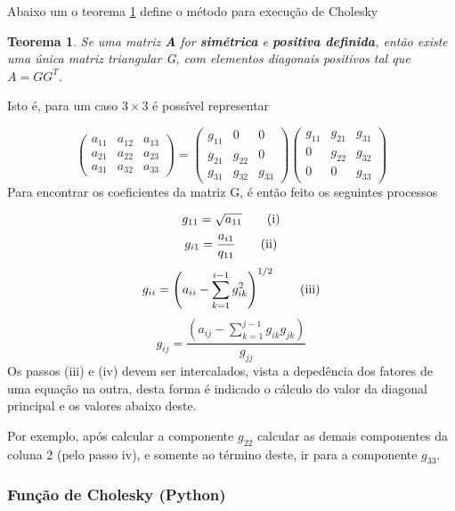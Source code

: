 \documentclass[
]{book}
\newtheorem{theorem}{Teorema}
\begin{document}
Abaixo um o teorema \ref{thm:cho} define o método para execução de Cholesky

\begin{theorem}
\protect\hypertarget{thm:cho}{}\label{thm:cho}Se uma matriz \textbf{A} for \textbf{simétrica} e \textbf{positiva definida}, então \emph{existe uma única} matriz triangular G, com elementos diagonais positivos tal que \(A = GG^T\).
\end{theorem}

Isto é, para um caso \(3 \times 3\) é possível representar

\[\begin{pmatrix} 
a_{11} & a_{12} & a_{13} \\
a_{21} & a_{22} & a_{23} \\
a_{31} & a_{32} & a_{33} 
\end{pmatrix} = 
\begin{pmatrix}
g_{11} & 0 & 0 \\
g_{21} & g_{22} & 0 \\
g_{31} & g_{32} & g_{33} 
\end{pmatrix}
\begin{pmatrix}
g_{11} & g_{21} & g_{31} \\
0 & g_{22} & g_{32} \\
0 & 0 & g_{33} 
\end{pmatrix}
\]
Para encontrar os coeficientes da matriz G, é então feito os seguintes processos

\[
g_{11} = \sqrt{a_{11}} \tag{i}\\
\]
\[
g_{i1} = \frac{a_{i1}}{q_{11}} \tag{ii}\\
\]
\[
g_{ii} = \left(a_{ii} - \sum_{k=1}^{i-1} g_{ik}^2 \right)^{1/2} \tag{iii}\\
\]
\[
g_{ij} = \frac{\left(a_{ij} - \sum_{k=1}^{j-1} g_{ik}g_{jk} \right)}{g_{jj}} \tag{iv}
\]
Os passos (iii) e (iv) devem ser intercalados, vista a depedência dos fatores de uma equação na outra, desta forma é indicado o cálculo do valor da diagonal principal e os valores abaixo deste.

Por exemplo, após calcular a componente \(g_{22}\) calcular as demais componentes da coluna 2 (pelo passo iv), e somente ao término deste, ir para a componente \(g_{33}\).

\hypertarget{funuxe7uxe3o-de-cholesky-python}{%
\subsubsection{Função de Cholesky (Python)}\label{funuxe7uxe3o-de-cholesky-python}}
\end{document}

